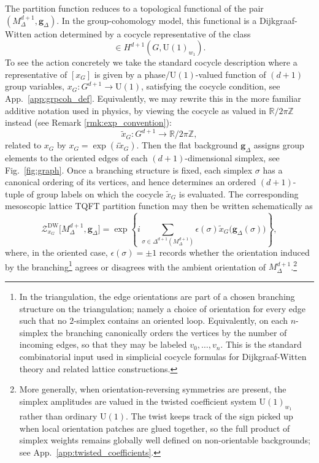 \documentclass[aps,prx,reprint,superscriptaddress,twocolumn,amsmath,amssymb,amsfonts, nofootinbib]{revtex4-2}
\newcommand{\U}{\text{U}}
\theoremstyle{apsstyle}
\begin{document}
The partition function reduces to a topological functional of the pair $(M^{d+1}_{\Delta},  {\mathbf g}_{\Delta})$. In the group-cohomology model, this functional is a Dijkgraaf-Witten action determined by a cocycle representative of the class
\begin{equation*}
    [x_G]\in H^{d+1}(G,\U(1)_{w_1}).
\end{equation*}
To see the action concretely we take the standard cocycle description where a representative of $[x_{G}]$ is given by a phase/$\U(1)$-valued function of $(d{+}1)$ group variables, $x_G:G^{d+1}\to \U(1)$, satisfying the cocycle condition, see App.~\ref{app:grpcoh_def}. Equivalently, we may rewrite this in the more familiar additive notation used in physics, by viewing the cocycle as valued in $\mathbb{R}/2\pi\mathbb{Z}$ instead (see Remark \ref{rmk:exp_convention}):
\begin{equation*}
    \widetilde{x}_G:G^{d+1}\to \mathbb{R}/2\pi\mathbb{Z},
\end{equation*}
related to $x_G$ by $x_G=\exp(i\widetilde{x}_G)$. Then the flat background ${\mathbf g}_{\Delta}$ assigns group elements to the oriented edges of each 
$(d+1)$-dimensional simplex, see Fig.~\ref{fig:graph}. Once a branching structure is fixed, each simplex $\sigma$ has a canonical ordering of its vertices, and hence determines an ordered $(d{+}1)$-tuple of group labels on which the cocycle $\widetilde{x}_G$ is evaluated. The corresponding mesoscopic lattice TQFT partition function may then be written schematically as
\begin{equation}
    \label{eq:DW}
    \mathcal{Z}^{\mathrm{DW}}_{x_G}\bigl[M^{d+1}_{\Delta}, {\mathbf g}_{\Delta}\bigr]
    =
    \exp\!\left\{
    i\sum_{\sigma\in \Delta^{d+1}(M^{d+1}_{\Delta})}
    \epsilon(\sigma)\widetilde{x}_G\bigl({\mathbf g}_{\Delta}(\sigma)\bigr)
    \right\},
\end{equation}
where, in the oriented case, $\epsilon(\sigma)=\pm1$ records whether the orientation induced by the branching\footnote{In the triangulation, the edge orientations are part of a chosen branching structure on the triangulation; namely a choice of orientation for every edge such that no $2$-simplex contains an oriented loop. Equivalently, on each $n$-simplex the branching canonically orders the vertices by the number of incoming edges, so that they may be labeled $v_0,\dots,v_n$. This is the standard combinatorial input used in simplicial cocycle formulas for Dijkgraaf-Witten theory and related lattice constructions.} agrees or disagrees with the ambient orientation of $M^{d+1}_{\Delta}$.\footnote{More generally, when orientation-reversing symmetries are present, the simplex amplitudes are valued in the twisted coefficient system $\U(1)_{w_1}$ rather than ordinary $\U(1)$. The twist keeps track of the sign picked up when local orientation patches are glued together, so the full product of simplex weights remains globally well defined on non-orientable backgrounds; see App.~\ref{app:twisted_coefficients}.}
\end{document}
